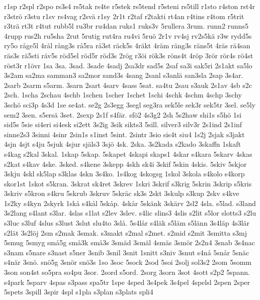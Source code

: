 {{r1sp
r2spl
r2spo
rs3s4
rs5tak
rs4te
r5stek
rs5tend
r5steni
rs5till
r1sto
r4ston
rst4r
r3str^^f6
r3stu
r1sv
rs4vag
r2sv^^e4
r1sy
2r1t
r2taf
r2takti
rt4an
r4tins
r4tom
r5trit
r3tr^^e4
rt3t
r4tut
rubb5l
ru3br
ru4dan
ruks1
ruks3v
5rullera
3rum.
runn2
runns5
4rupp
rus2h
ru5sha
2rut
5rutig
rut4ra
ru4vi
5ru^^f6
2r1v
rv4sj
rv2s5k^^e4
r3w
rydd5s
ry5o
r^^e5ge5l
4r^^e5l
r^^e5ng3s
r^^e55ra
r^^e53st
r^^e4ck5s
4r^^e4kt
4r^^e4m
r^^e4ng3s
r^^e4ns5t
4r^^e4s
r^^e44san
r^^e4s3s
r^^e45sti
r^^e4v5s
r^^f6d5el
r^^f6d5r
r^^f6d3s
2r^^f6g
r3^^f6i
r^^f6k3s
r^^f6ns4t
4r^^f6p
3r^^f6r
r^^f6r4s
r^^f64st
r^^f6st3r
r1^^f6vr
1sa
3sa.
3sad.
3sade
4sadj
2sa3dr
sad5s
2saf
sa3i
sak5ri
2s1akt
sa5lo
3s2am
sa2ma
samman3
sa2mor
sand3s
4sang
2sanl
s3anl^^e4
san3sla
2sap
3s4ar.
2sarb
2sarm
s5arm.
3sarn
2sart
4sarv
4sass
5sat.
sa4tu
2sau
s3auk
2s1av
4sb
s2c
2sch.
1scha
2schau
4schb
1schen
1scher
1schet
1schi
4schk
4schm
4schp
3schy
3sch^^f6
sci3p
4s3d
1se
se4at.
se2g
2s3egg
3segl
seg3ra
sek5le
sek3r
sek5tr
3sel.
se5ly
sem2
3sen.
s5ers^^e4
3set.
2sexp
2s1f
s4f^^e4r.
sf^^f62
4s3g2
2sh
5s2haw
shi1s
s5h^^f6
1si
sid5s
5sie
si4eri
si4esk
si2ett
3s2ig
3sik
sikts3
5sill.
silver3
silv3r
2s1ind
2s1inf
sinne2s3
3sinni
4sinr
2sin1s
s1inst
5sint.
2sintr
3sio
sis4t
siu4
1s2j
2sjak
s3jakt
4sjn
4sjt
s4ju
5sjuk
4sjur
sj^^e4ls3
3sj^^f6
4sk.
2ska.
3s2kada
s2kado
3skaffn
1skaft
s4kag
s2kal
3skal.
1skap
5skap.
5skapet
4skapi
skaps1
4skar
s4kara
5skarv
4skas
s2kat
s4kav
4ske.
3sked.
s4kene
3skepp
4skh
sk4i
3skif
5skin
4skis.
5skiv
5skjor
3skju
4skl
sk5lap
s3klas
4skn
3s4ko.
1s4kog
4skogsg
1skol
3skola
s4kolo
s4korp
skor1st
1skot
s5kran.
3skrat
sk4ret
3skrev
1skri
3skrif
s3krig
5skrin
3skrip
s5kris
3skriv
s5kron
s4kru
5skrub
3skruv
5skr^^e4c
sk3s
2skt
3skulp
s3kup
2skv
s4kve
1s2ky
s4kyn
2skyrk
1sk^^e5
s4k^^e5l
5sk^^e5p.
4sk^^e5r
5sk^^e4nk
3sk^^e4rv
2sl2
4sla.
s5lad.
s3land
3s2lang
s4lant
s3lar.
4slas
s1lat
s2lev
3slev.
s4lic
slins3
4slis
s2lit
s5lor
slotts3
s2lu
s3luc
s3luf
4slus
s3lust
3slut
slu4to
3sl^^e5.
5s4l^^e5r
s4l^^e4k
s5l^^e4m
s5l^^e4nn
3s4l^^e4p
4s3l^^e4r
s2l^^e4t
3s2l^^f6j
2sm
s2mak
3smak.
s3makt
s2mal
s2met.
s2mid
s2mit
3smitta
s3mj
5smug
5smyg
sm^^e55g
sm^^e53k
sm^^e53s
3sm^^e4d
3sm^^e4l
4sm^^e4s
3sm^^f6r
2s2n4
3snab
3s4nac
s3nam
s5nare
s3nast
s5ner
3snib
3snil
3snit
1snitt
s3niv
3snut
s4n^^e5
5sn^^e5r
5sn^^e4c
s4n^^e4r
3sn^^f6.
sn^^f65g
3sn^^f6r
sn^^f63s
1so
3soc
5sock
2sod
5soi
2solj
sol3s2
2som
5somm
3son
son4st
so5pra
so4pu
3sor.
2sord
s5ord.
2sorg
3sorn
3sot
4sott
s2p2
5spann.
s4park
5sparv
4spas
s3pass
spa5tr
1spe
4sped
3s4pek
3s4pel
4spelsl
2spen
2sper
5spets
3spill
3spir
4spl
s1pla
s3plan
s3plats
spli4
}}
